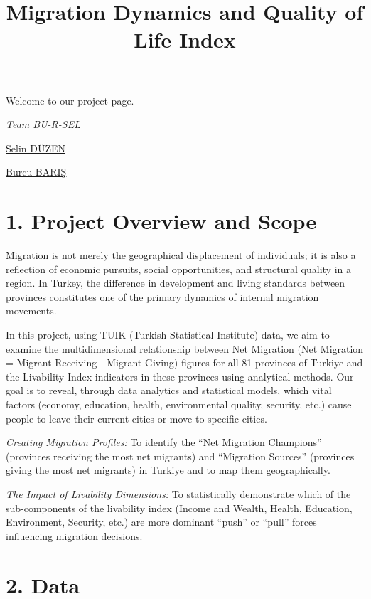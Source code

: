 \documentclass[
  11pt,
  a4paper,
  DIV=11,
  numbers=noendperiod]{scrartcl}
\title{Migration Dynamics and Quality of Life Index}
\author{}
\date{}
\begin{document}
\maketitle


Welcome to our project page.

\emph{Team BU-R-SEL}

\href{https://emu-hacettepe-analytics.github.io/emu660-spring2026-Selindznn/project.html}{Selin
DÜZEN}

\href{https://emu-hacettepe-analytics.github.io/emu660-spring2026-burcubaris/project.html}{Burcu
BARIŞ}

\section{1. Project Overview and
Scope}\label{project-overview-and-scope}

Migration is not merely the geographical displacement of individuals; it
is also a reflection of economic pursuits, social opportunities, and
structural quality in a region. In Turkey, the difference in development
and living standards between provinces constitutes one of the primary
dynamics of internal migration movements.

In this project, using TUIK (Turkish Statistical Institute) data, we aim
to examine the multidimensional relationship between Net Migration (Net
Migration = Migrant Receiving - Migrant Giving) figures for all 81
provinces of Turkiye and the Livability Index indicators in these
provinces using analytical methods. Our goal is to reveal, through data
analytics and statistical models, which vital factors (economy,
education, health, environmental quality, security, etc.) cause people
to leave their current cities or move to specific cities.

\emph{Creating Migration Profiles:} To identify the ``Net Migration
Champions'' (provinces receiving the most net migrants) and ``Migration
Sources'' (provinces giving the most net migrants) in Turkiye and to map
them geographically.

\emph{The Impact of Livability Dimensions:} To statistically demonstrate
which of the sub-components of the livability index (Income and Wealth,
Health, Education, Environment, Security, etc.) are more dominant
``push'' or ``pull'' forces influencing migration decisions.

\section{2. Data}\label{data}
\end{document}
